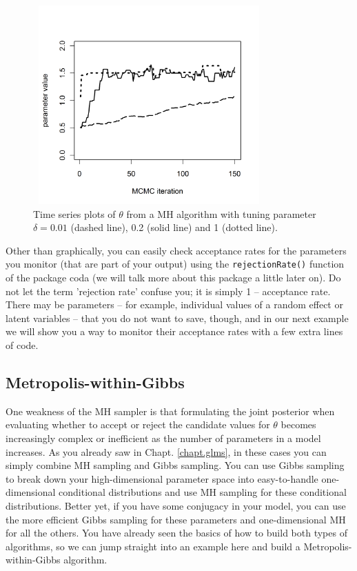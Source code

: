  \begin{figure}
\begin{center}
\includegraphics[height=3in,width=3.5in]{Ch7/figs/tuning}
\end{center}
\caption{Time series plots of $\theta$ from a MH algorithm with tuning parameter  $\delta = 0.01$ (dashed line), 0.2 (solid line) and  1 (dotted line).}
\label{mcmc.fig.tuning}
\end{figure}

Other than graphically, you can easily check acceptance rates for the
parameters you monitor (that are part of your output) using the
\verb#rejectionRate()# function of the package coda (we will talk more
about this package a little later on). Do not let the term 'rejection
rate' confuse you; it is simply 1 -- acceptance rate. There may be
parameters -- for example, individual values of a random effect or
latent variables -- that you do not want to save, though, and in our
next example we will show you a way to monitor their acceptance rates
with a few extra lines of code.



\subsection{ Metropolis-within-Gibbs }

One weakness of the MH sampler is that formulating the joint posterior
when evaluating whether to accept or reject the candidate values for
$\theta$ becomes increasingly complex or inefficient as the number of
parameters in a model increases. As you already saw in Chapt. \ref{chapt.glms}, in
these cases you can simply combine MH sampling and Gibbs sampling. You
can use Gibbs sampling to break down your high-dimensional parameter
space into easy-to-handle one-dimensional conditional distributions
and use MH sampling for these conditional distributions. Better yet,
if you have some conjugacy in your model, you can use the more
efficient Gibbs sampling for these parameters and one-dimensional MH
for all the others. You have already seen the basics of how to build
both types of algorithms, so we can jump straight into an example here
and build a Metropolis-within-Gibbs algorithm.

